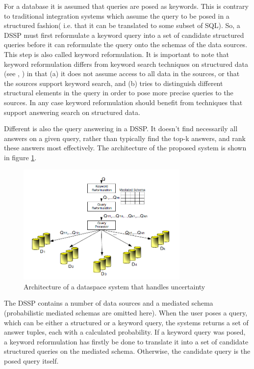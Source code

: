 For a database it is assumed that queries are posed as keywords. This is contrary to traditional integration systems which assume the query to be posed in a structured fashion( i.e. that it can be translated to some subset of SQL). So, a DSSP must first reformulate a keyword query into a set of candidate structured queries before it can reformulate the query onto the schemas of the data sources. This step is also called keyword reformulation. 
It is important to note that keyword reformulation differs from keyword search techniques on structured data (see \cite{994693}, \cite{Hristidis:2002:DKS:1287369.1287427}) in that (a) it does not assume access to all data in the sources, or that the sources support keyword search, and (b) tries to distinguish different structural elements in the query in order to pose more precise queries to the sources. In any case keyword reformulation should benefit from techniques that support answering search on structured data.

Different is also the query answering in a DSSP. It doesn't find necessarily all answers on a given query, rather than typically find the top-k answers, and rank these answers most effectively. 
The architecture of the proposed system is shown in figure \ref{DataModelingInDSSPsFigure1}.

\begin{figure}[H]
	\begin{center}
		\includegraphics[width=0.75\textwidth]{figures/DataModelingInDSSPs-Figure1.png}
	\end{center}
	\caption{Architecture of a dataspace system that handles uncertainty \cite[p. 124]{DBLP:conf/birthday/SarmaDH09}}
	\label{DataModelingInDSSPsFigure1}
\end{figure}

The DSSP contains a number of data sources and a mediated schema (probabilistic mediated schemas are omitted here). When the user poses a query, which can be either a structured or a keyword query, the systems returns a set of answer tuples, each with a calculated probability. If a keyword query was posed, a keyword reformulation has firstly be done to translate it into a set of candidate structured queries on the mediated schema. Otherwise, the candidate query is the posed query itself.